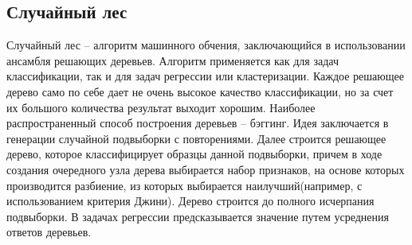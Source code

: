 \subsection{Случайный лес}
Случайный лес -- алгоритм машинного обчения, заключающийся в использовании ансамбля решающих деревьев. Алгоритм применяется как для задач классификации, так и для задач регрессии или кластеризации. Каждое решающее дерево само по себе дает не очень высокое качество классификации, но за счет их большого количества результат выходит хорошим.
\newline
Наиболее распространенный способ построения деревьев -- бэггинг. Идея заключается в генерации случайной подвыборки с повторениями. Далее строится решающее дерево, которое классифицирует образцы данной подвыборки, причем в ходе создания очередного узла дерева выбирается набор признаков, на основе которых производится разбиение, из которых выбирается наилучший(например, с использованием критерия Джини). Дерево строится до полного исчерпания подвыборки.
\newline
В задачах регрессии предсказывается значение путем усреднения ответов деревьев.